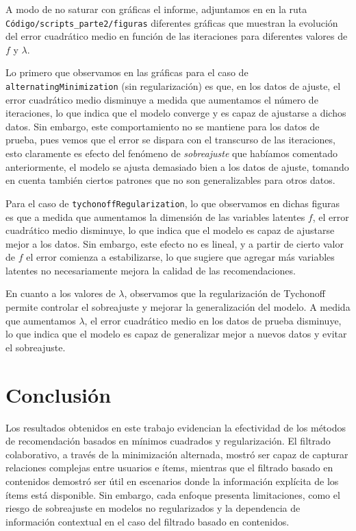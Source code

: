 \documentclass[12pt,a4paper]{article}
\begin{document}
A modo de no saturar con gráficas el informe, adjuntamos en \cite{repoGithub} en la ruta\\ \texttt{Código/scripts\_parte2/figuras} diferentes gráficas que muestran la evolución del error cuadrático medio en función de las iteraciones para diferentes valores de \( f \) y \( \lambda \).	

Lo primero que observamos en las gráficas para el caso de \texttt{alternatingMinimization} (sin regularización) es que, en los datos de ajuste, el error cuadrático medio disminuye a medida que aumentamos el número de iteraciones, lo que indica que el modelo converge y es capaz de ajustarse a dichos datos. Sin embargo, este comportamiento no se mantiene para los datos de prueba, pues vemos que el error se dispara con el transcurso de las iteraciones, esto claramente es efecto del fenómeno de \textit{sobreajuste} que habíamos comentado anteriormente, el modelo se ajusta demasiado bien a los datos de ajuste, tomando en cuenta también ciertos patrones que no son generalizables para otros datos.

Para el caso de \texttt{tychonoffRegularization}, lo que observamos en dichas figuras es que a medida que aumentamos la dimensión de las variables latentes \( f \), el error cuadrático medio disminuye, lo que indica que el modelo es capaz de ajustarse mejor a los datos. Sin embargo, este efecto no es lineal, y a partir de cierto valor de \( f \) el error comienza a estabilizarse, lo que sugiere que agregar más variables latentes no necesariamente mejora la calidad de las recomendaciones.

En cuanto a los valores de \( \lambda \), observamos que la regularización de Tychonoff permite controlar el sobreajuste y mejorar la generalización del modelo. A medida que aumentamos \( \lambda \), el error cuadrático medio en los datos de prueba disminuye, lo que indica que el modelo es capaz de generalizar mejor a nuevos datos y evitar el sobreajuste.


\section*{Conclusión}

Los resultados obtenidos en este trabajo evidencian la efectividad de los métodos de recomendación basados en mínimos cuadrados y regularización. El filtrado colaborativo, a través de la minimización alternada, mostró ser capaz de capturar relaciones complejas entre usuarios e ítems, mientras que el filtrado basado en contenidos demostró ser útil en escenarios donde la información explícita de los ítems está disponible. Sin embargo, cada enfoque presenta limitaciones, como el riesgo de sobreajuste en modelos no regularizados y la dependencia de información contextual en el caso del filtrado basado en contenidos.
\end{document}
